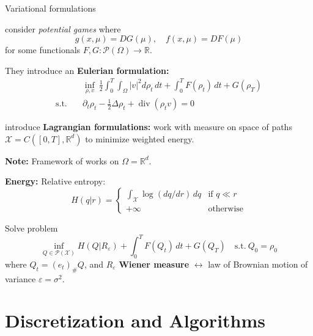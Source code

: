 \documentclass[xcolor={dvipsnames}]{beamer}
\newcommand{\RR}{\mathbb{R}}
\newcommand{\calP}{\mathcal{P}}
\newcommand{\calX}{\mathcal{X}}
\renewcommand{\epsilon}{\varepsilon}
\DeclareMathOperator{\divg}{div}
\begin{document}
\begin{frame}[allowframebreaks]{Variational formulations}
	
	\textcite{benamou:hal-01295299,benamou2018entropy} consider \textit{potential games} where
	\[
		g(x,\mu) = DG(\mu), \quad
		f(x,\mu) = DF(\mu)
	\]
	for some functionals $F,G: \calP(\Omega) \to \RR$.
	
	They introduce an \textbf{Eulerian formulation:}
	\begin{subequations}
	\begin{align}
		&\inf_{\rho,v}~
		\frac{1}{2}\int_0^T \int_\Omega |v|^2 d\rho_t \, dt +
		\int_0^T F(\rho_t) \, dt +
		G(\rho_T) \\
		\text{s.t.} \quad & \partial_t \rho_t -\frac{1}{2}\Delta\rho_t + \divg(\rho_t v) = 0
	\end{align}	
	\end{subequations}

	\framebreak
	
	
	\citeauthor{benamou:hal-01295299,benamou2018entropy} introduce \textbf{Lagrangian formulations:} work with measure on space of paths $\calX = C([0,T], \RR^d)$ to minimize weighted energy.
	
	\textbf{Note:} Framework of \textcite{benamou2018entropy} works on $\Omega = \RR^d$.
	
	\textbf{Energy:} Relative entropy:
	\[
		H(q|r) = \begin{cases}
		\int_\calX \log(dq/dr)\, dq &\mbox{if } q \ll r  \\
		+\infty &\mbox{otherwise}
		\end{cases}
	\]
	
	\framebreak
	
	Solve problem
	\begin{equation}
		\inf_{Q \in \calP(\calX)}
		H(Q|R_\epsilon) + 
		\int_0^T F(Q_t) \,dt +
		G(Q_T)
		\quad \text{s.t.}\ Q_0 = \rho_0
	\end{equation}
	where $Q_t = (e_t)_\# Q$, and $R_\epsilon$ \textbf{Wiener measure} $\leftrightarrow$ law of Brownian motion of variance $\epsilon = \sigma^2$.
	
	
\end{frame}


\section{Discretization and Algorithms}
\end{document}
